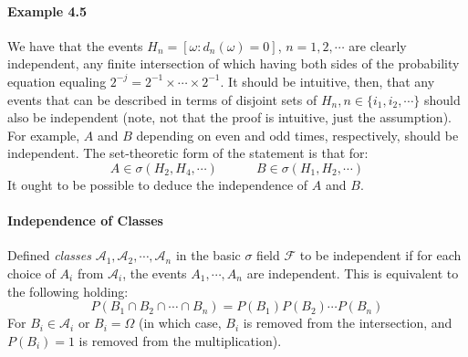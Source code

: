 \documentclass[12pt,a4paper]{article}
\newcommand{\1}[1]{\mathbbm{1}\left\{ #1 \right\}}
\newcommand{\acal}{\mathcal{A}}
\newcommand{\fcal}{\mathcal{F}}
\begin{document}
\paragraph{Example 4.5} We have that the events $H_n = [\omega: d_n(\omega) = 0]$, $n = 1, 2, \cdots$ are clearly independent, any finite intersection of which having both sides of the probability equation equaling $2^{-j} = 2^{-1} \times \cdots \times 2^{-1}$. It should be intuitive, then, that any events that can be described in terms of disjoint sets of $H_n, n \in \{i_1, i_2, \cdots\}$ should also be independent (note, not that the proof is intuitive, just the assumption). For example, $A$ and $B$ depending on even and odd times, respectively, should be independent. The set-theoretic form of the statement is that for:
$$
	A \in \sigma(H_2, H_4, \cdots) \quad\quad\quad
	B \in \sigma(H_1, H_2, \cdots)	
$$
It ought to be possible to deduce the independence of $A$ and $B$.

\paragraph{Independence of Classes} Defined \textit{classes} $\acal_1, \acal_2, \cdots, \acal_n$ in the basic $\sigma$ field $\fcal$ to be independent if for each choice of $A_i$ from $\acal_i$, the events $A_1, \cdots, A_n$ are independent. This is equivalent to the following holding:
$$
	P(B_1 \cap B_2 \cap \cdots \cap B_n) = P(B_1)P(B_2) \cdots P(B_n)
$$
For $B_i \in \acal_i$ or $B_i = \Omega$ (in which case, $B_i$ is removed from the intersection, and $P(B_i) = 1$ is removed from the multiplication).
\end{document}
